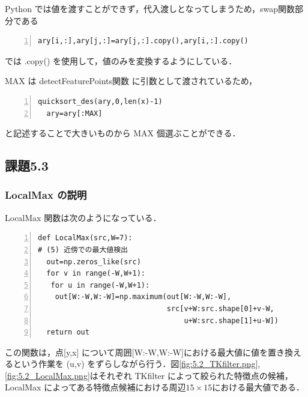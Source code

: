 \documentclass[autodetect-engine,dvi=dvipdfmx,ja=standard,
               a4j,11pt]{bxjsarticle}
\begin{document}
Python では値を渡すことができず，代入渡しとなってしまうため，swap関数部分である

\begin{Verbatim}[numbers=left, xleftmargin=10mm, numbersep=6pt,
                    fontsize=\small, baselinestretch=0.8]
      ary[i,:],ary[j,:]=ary[j,:].copy(),ary[i,:].copy()
\end{Verbatim}

では .copy() を使用して，値のみを変換するようにしている．

MAX は detectFeaturePoints関数 に引数として渡されているため，

\begin{Verbatim}[numbers=left, xleftmargin=10mm, numbersep=6pt,
                    fontsize=\small, baselinestretch=0.8]
  quicksort_des(ary,0,len(x)-1)
  ary=ary[:MAX]
\end{Verbatim}

と記述することで大きいものから MAX 個選ぶことができる．


\subsection{課題5.3}
\subsubsection{LocalMax の説明}
LocalMax 関数は次のようになっている．

\begin{Verbatim}[numbers=left, xleftmargin=10mm, numbersep=6pt,
                    fontsize=\small, baselinestretch=0.8]
def LocalMax(src,W=7):
# (5) 近傍での最大値検出
  out=np.zeros_like(src)
  for v in range(-W,W+1):
   for u in range(-W,W+1):
    out[W:-W,W:-W]=np.maximum(out[W:-W,W:-W],
                              src[v+W:src.shape[0]+v-W,
                                  u+W:src.shape[1]+u-W])
  return out
\end{Verbatim}

この関数は，点[y,x] について周囲[W:-W,W:-W]における最大値に値を置き換えるという作業を (u,v) をずらしながら行う．図\ref{fig:5.2_TKfilter.png},\ref{fig:5.2_LocalMax.png}はそれぞれ TKfilter によって絞られた特徴点の候補，LocalMax によってある特徴点候補における周辺$15 \times 15$における最大値である．
\end{document}
